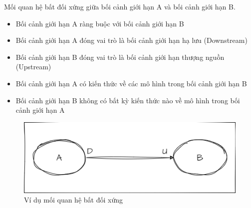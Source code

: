\begin{example} Mối quan hệ bất đối xứng giữa      bối cảnh giới hạn A và     bối cảnh giới hạn B.
\begin{itemize}
    \item      Bối cảnh giới hạn  A ràng buộc với      bối cảnh giới hạn  B

    \item      Bối cảnh giới hạn  A đóng vai trò là bối cảnh giới hạn hạ lưu (Downstream)

    \item      Bối cảnh giới hạn  B đóng vai trò là bối cảnh giới hạn thượng nguồn (Upstream)

    \item      Bối cảnh giới hạn    A có kiến thức về các mô hình trong bối cảnh giới hạn B

    \item      Bối cảnh giới hạn  B không có bất kỳ kiến thức nào về mô hình trong bối cảnh giới hạn A
\end{itemize}



\begin{figure}[H]

    \centering

    \includegraphics[scale = 0.5]{pictures/moi_quan_he_bat_doi_xung/main.drawio.png}

    \caption{Ví dụ  mối quan hệ bất đối xứng }

\end{figure}


\end{example}